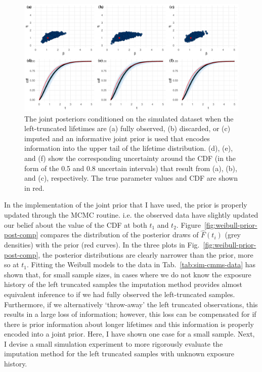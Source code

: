 \begin{figure}
    \centering
    \includegraphics[width=1\textwidth]{./figures/ch-2/joint-posts-inf.pdf}
    \caption{The joint posteriors conditioned on the simulated dataset when the left-truncated lifetimes are (a) fully observed, (b) discarded, or (c) imputed and an informative joint prior is used that encodes information into the upper tail of the lifetime distribution. (d), (e), and (f) show the corresponding uncertainty around the CDF (in the form of the 0.5 and 0.8 uncertain intervals) that result from (a), (b), and (c), respectively. The true parameter values and CDF are shown in red.}
    \label{fig:joint-post-weibull-inf}
\end{figure}

In the implementation of the joint prior that I have used, the prior is properly updated through the MCMC routine. i.e. the observed data have slightly updated our belief about the value of the CDF at both $t_1$ and $t_2$. Figure~\ref{fig:weibull-prior-post-comp} compares the distribution of the posterior draws of $\hat{F}(t_i)$ (grey densities) with the prior (red curves). In the three plots in Fig.~\ref{fig:weibull-prior-post-comp}, the posterior distributions are clearly narrower than the prior, more so at $t_1$. Fitting the Weibull models to the data in Tab.~\ref{tab:sim-cmms-data} has shown that, for small sample sizes, in cases where we do not know the exposure history of the left truncated samples the imputation method provides almost equivalent inference to if we had fully observed the left-truncated samples. Furthermore, if we alternatively `throw-away' the left truncated observations, this results in a large loss of information; however, this loss can be compensated for if there is prior information about longer lifetimes and this information is properly encoded into a joint prior. Here, I have shown one case for a small sample. Next, I devise a small simulation experiment to more rigorously evaluate the imputation method for the left truncated samples with unknown exposure history.

